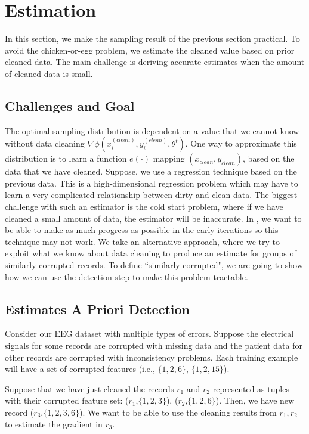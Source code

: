 \section{Estimation}\label{sampling}
In this section, we make the sampling result of the previous section practical.
To avoid the chicken-or-egg problem, we estimate the cleaned value based on prior cleaned 
data.
The main challenge is deriving accurate estimates when the amount of cleaned data is small.

\subsection{Challenges and Goal}
The optimal sampling distribution is dependent on a value that we cannot know without data cleaning $\nabla\phi(x^{(clean)}_i,y^{(clean)}_i,\theta^t)$.
One way to approximate this distribution is to learn a function $e(\cdot)$ mapping $(x_{clean}, y_{clean})$, based on the data that we have cleaned.
Suppose, we use a regression technique based on the previous data.
This is a high-dimensional regression problem which may have to learn a very complicated relationship between dirty and clean data.
The biggest challenge with such an estimator is the cold start problem, where if we have cleaned a small amount of data, the estimator will be inaccurate.
In \sys, we want to be able to make as much progress as possible in the early iterations so this technique may not work.
We take an alternative approach, where we try to exploit what we know about data cleaning to produce an estimate for groups of similarly corrupted records.
To define ``similarly corrupted", we are going to show how we can use the detection step to make this problem tractable.

\subsection{Estimates A Priori Detection}
\begin{example}
Consider our EEG dataset with multiple types of errors. 
Suppose the electrical signals for some records are corrupted with missing data and the patient data for other records are corrupted with inconsistency problems. 
Each training example will have a set of corrupted features (i.e., $\{1,2,6\}$, $\{1,2,15\}$).

Suppose that we have just cleaned the records $r_1$ and $r_2$ represented as tuples with their corrupted feature set: ($r_1$,$\{1,2,3\}$), ($r_2$,$\{1,2,6\}$).
Then, we have new record ($r_3$,$\{1,2,3,6\}$). 
We want to be able to use the cleaning results from $r_1,r_2$ to estimate the gradient in $r_3$.
\end{example}

